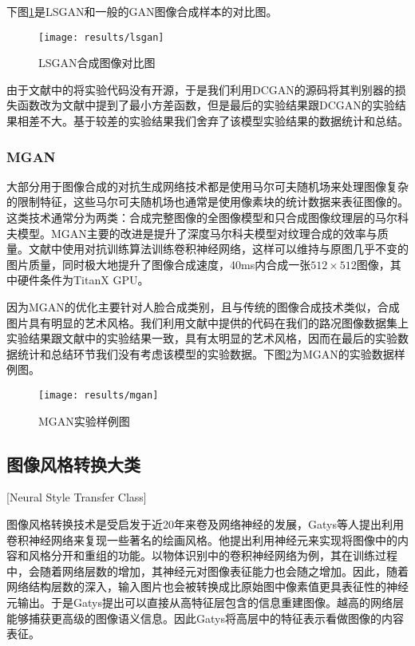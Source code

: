 下图\ref{fig:lsgan}是LSGAN和一般的GAN图像合成样本的对比图。

\begin{figure}[h]
    \centering
    \texttt{[image: results/lsgan]}
    \caption{LSGAN合成图像对比图}
    \label{fig:lsgan}
\end{figure}

由于文献中的将实验代码没有开源，于是我们利用DCGAN的源码将其判别器的损失函数改为文献中提到了最小方差函数，但是最后的实验结果跟DCGAN的实验结果相差不大。基于较差的实验结果我们舍弃了该模型实验结果的数据统计和总结。

\subsubsection{MGAN}

 大部分用于图像合成的对抗生成网络技术都是使用马尔可夫随机场来处理图像复杂的限制特征，这些马尔可夫随机场也通常是使用像素块的统计数据来表征图像的。这类技术通常分为两类：合成完整图像的全图像模型和只合成图像纹理层的马尔科夫模型。MGAN主要的改进是提升了深度马尔科夫模型对纹理合成的效率与质量。文献\cite{MGAN}中使用对抗训练\cite{adtrain}算法训练卷积神经网络，这样可以维持与原图几乎不变的图片质量，同时极大地提升了图像合成速度，40ms内合成一张$512\times 512$图像，其中硬件条件为TitanX GPU。

因为MGAN的优化主要针对人脸合成类别，且与传统的图像合成技术类似，合成图片具有明显的艺术风格。我们利用文献中提供的代码\cite{git:mgan}在我们的路况图像数据集上实验结果跟文献中的实验结果一致，具有太明显的艺术风格，因而在最后的实验数据统计和总结环节我们没有考虑该模型的实验数据。下图\ref{fig:mag}为MGAN的实验数据样例图。

\begin{figure}[h] 
    \centering
    \texttt{[image: results/mgan]}
    \caption{MGAN实验样例图}
    \label{fig:mag}
\end{figure}


\subsection{图像风格转换大类}[Neural Style Transfer Class]

图像风格转换技术是受启发于近20年来卷及网络神经的发展，Gatys等人\cite{nst}提出利用卷积神经网络来复现一些著名的绘画风格。他提出利用神经元来实现将图像中的内容和风格分开和重组的功能。以物体识别中的卷积神经网络为例，其在训练过程中，会随着网络层数的增加，其神经元对图像表征能力也会随之增加。因此，随着网络结构层数的深入，输入图片也会被转换成比原始图中像素值更具表征性的神经元输出。于是Gatys提出可以直接从高特征层包含的信息重建图像。越高的网络层能够捕获更高级的图像语义信息。因此Gatys将高层中的特征表示看做图像的内容表征。

